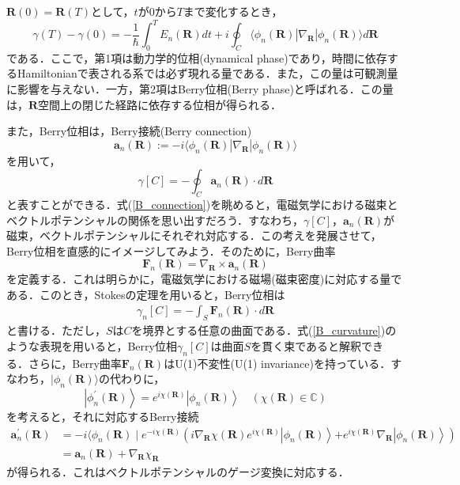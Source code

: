 \documentclass[a4paper, titlepage]{jsreport}
\begin{document}
$\bm{R}(0) = \bm{R}(T)$として，$t$が$0$から$T$まで変化するとき，
\begin{equation}
  \gamma(T) - \gamma(0) = -\frac{1}{\hbar} \int_0^T E_n(\bm{R}) dt + i \oint_C \langle \phi_n(\bm{R}) | \nabla_{\bm{R}} | \phi_n(\bm{R}) \rangle d\bm{R}
\end{equation}
である．ここで，第1項は動力学的位相(dynamical phase)であり，時間に依存するHamiltonianで表される系では必ず現れる量である．また，この量は可観測量に影響を与えない．一方，第2項はBerry位相(Berry phase)と呼ばれる．この量は，$\bm{R}$空間上の閉じた経路に依存する位相が得られる．


また，Berry位相は，Berry接続(Berry connection)
\begin{equation}
  \bm{a}_n(\bm{R}) := -i \langle \phi_n(\bm{R}) | \nabla_{\bm{R}} | \phi_n(\bm{R}) \rangle
\end{equation}
を用いて，
\begin{equation}
  \gamma[C] = - \oint_C \bm{a}_n(\bm{R}) \cdot d\bm{R} \label{B_connection}
\end{equation}
と表すことができる．式(\ref{B_connection})を眺めると，電磁気学における磁束とベクトルポテンシャルの関係を思い出すだろう．すなわち，$\gamma[C]$，$\bm{a}_n(\bm{R})$が磁束，ベクトルポテンシャルにそれぞれ対応する．この考えを発展させて，Berry位相を直感的にイメージしてみよう．そのために，Berry曲率
\begin{equation}
  \bm{F}_n(\bm{R}) = \nabla_{\bm{R}} \times \bm{a}_n(\bm{R})
\end{equation}
を定義する．これは明らかに，電磁気学における磁場(磁束密度)に対応する量である．このとき，Stokesの定理を用いると，Berry位相は
\begin{align}
  \gamma_n[C] = - \int_S \bm{F}_n(\bm{R}) \cdot d\bm{R} \label{B_curvature}
\end{align}
と書ける．ただし，$S$は$C$を境界とする任意の曲面である．式(\ref{B_curvature})のような表現を用いると，Berry位相$\gamma_n[C]$は曲面$S$を貫く束であると解釈できる．さらに，Berry曲率$\bm{F}_n(\bm{R})$はU(1)不変性(U(1) invariance)を持っている．すなわち，$|\phi_n(\bm{R}) \rangle$の代わりに，
\begin{equation}
  \left|\phi_n^{\prime}(\bm{R})\right\rangle=e^{i \chi(\bm{R})}\left|\phi_n(\bm{R})\right\rangle \quad (\chi(\bm{R}) \in \mathbb{C})
\end{equation}
を考えると，それに対応するBerry接続
\begin{align}
\bm{a}_n^{\prime}(\bm{R}) &= -i\langle \phi_n(\bm{R}) \mid e^{-i\chi(\bm{R})}\left(i \nabla_{\bm{R}} \chi(\bm{R}) e^{i \chi(\bm{R})}\left|\phi_n(\bm{R})\right\rangle\right. \left.+e^{i \chi(\bm{R})} \nabla_{\bm{R}}\left|\phi_n(\bm{R})\right\rangle\right)\\
&= \bm{a}_n(\bm{R})+  \nabla_{\bm{R}} \chi_{\bm{R}}
\end{align}
が得られる．これはベクトルポテンシャルのゲージ変換に対応する．
\end{document}
